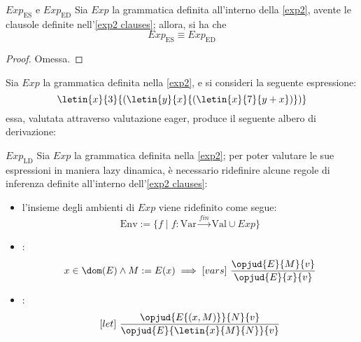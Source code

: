 \documentclass[a4paper, 12pt]{report}
\begin{document}
    \begin{framedlem}{$Exp_\mathrm{ES}$ e $Exp_\mathrm{ED}$}
        Sia $Exp$ la grammatica definita all'interno della \cref{exp2}, avente le clausole definite nell'\cref{exp2 clauses}; allora, si ha che $$Exp_\mathrm{ES} \equiv Exp_\mathrm{ED}$$
    \end{framedlem}

    \begin{proof}
        Omessa.
    \end{proof}

    \begin{example}
        \label{eager2}
        Sia $Exp$ la grammatica definita nella \cref{exp2}, e si consideri la seguente espressione: $$\letin{x}{3}{(\letin{y}{x}{(\letin{x}{7}{y + x})})}$$ essa, valutata attraverso valutazione eager, produce il seguente albero di derivazione: 
    \end{example}

    \begin{framedprop}[label={exp ld}]{$Exp_\mathrm{LD}$}
        Sia $Exp$ la grammatica definita nella \cref{exp2}; per poter valutare le sue espressioni in maniera lazy dinamica, è necessario ridefinire alcune regole di inferenza definite all'interno dell'\cref{exp2 clauses}:

        \begin{itemize}
            \item l'insieme degli ambienti di $Exp$ viene ridefinito come segue: $$\mathrm{Env} := \{f \mid f :\mathrm{Var} \xrightarrow{fin} \mathrm{Val} \cup Exp\}$$
            \item {}: $$x \in \dom(E) \land M := E(x) \implies [vars] \ \dfrac{\opjud{E}{M}{v}}{\opjud{E}{x}{v}}$$
            \item {}: $$[let] \ \dfrac{\opjud{E\{(x, M)\}}{N}{v}}{\opjud{E}{\letin{x}{M}{N}}{v}}$$
        \end{itemize}
    \end{framedprop}
\end{document}
